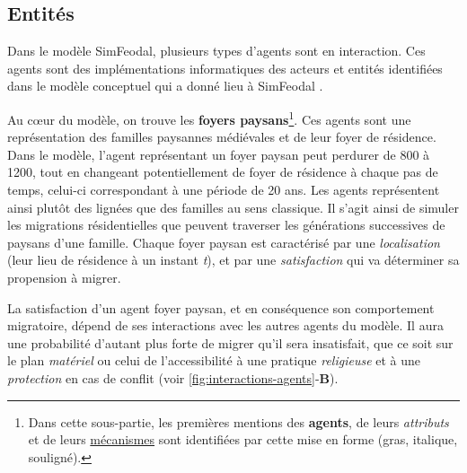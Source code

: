 \vspace{-.5em}
\subsection{Entités \label{subsec:entites}}


%		

Dans le modèle SimFeodal, plusieurs types d'agents sont en interaction. Ces agents sont des implémentations informatiques des acteurs et entités identifiées dans le modèle conceptuel qui a donné lieu à SimFeodal \autocite[voir][Tableau 1, \ppno~309--310]{cura_transition_2017}.

 Au cœur du modèle, on trouve les \textbf{foyers paysans}\footnote{
	Dans cette sous-partie, les premières mentions des \textbf{agents}, de leurs \textit{attributs} et de leurs \ul{mécanismes} sont identifiées par cette mise en forme (gras, italique, souligné).
}.
Ces agents sont une représentation des familles paysannes médiévales et de leur foyer de résidence.
Dans le modèle, l'agent représentant un foyer paysan peut perdurer de 800 à 1200, tout en changeant potentiellement de foyer de résidence à chaque pas de temps, celui-ci correspondant à une période de 20 ans.
Les agents représentent ainsi plutôt des lignées que des familles au sens classique.
Il s'agit ainsi de simuler les migrations résidentielles que peuvent traverser les générations successives de paysans d'une famille.
Chaque foyer paysan est caractérisé par une \textit{localisation} (leur lieu de résidence à un instant \textit{t}), et par une \textit{satisfaction} qui va déterminer sa propension à migrer.

La satisfaction d'un agent foyer paysan, et en conséquence son comportement migratoire, dépend de ses interactions avec les autres agents du modèle.
Il aura une probabilité d'autant plus forte de migrer qu'il sera insatisfait, que ce soit sur le plan \textit{matériel} ou celui de l'accessibilité à une pratique \textit{religieuse} et à une \textit{protection} en cas de conflit (voir \cref{fig:interactions-agents}-\textbf{B}).

